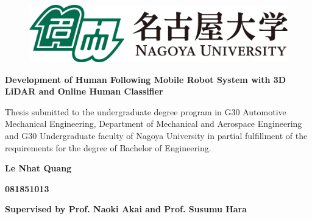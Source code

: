 \documentclass[12pt, oneside]{book}
\begin{document}
\begin{titlepage}
  \begin{center}

    \begin{figure}
      \hspace*{-0.7cm}
      \centering
      \includegraphics[scale=0.5]{figures/Nagoya_Logo.png}
      \vspace{0.8cm}
    \end{figure}

    \vspace*{2cm}

    {\Large \textbf{Development of Human Following Mobile Robot System with 3D LiDAR and Online Human Classifier}} %

    \vspace*{2cm}
    { Thesis submitted to the undergraduate degree program in G30 Automotive Mechanical Engineering, Department of Mechanical and Aerospace Engineering and G30 Undergraduate faculty of Nagoya University in partial fulfillment of the requirements for the degree of Bachelor of Engineering.}

    \vspace*{2cm}
    {\large \textbf{Le Nhat Quang}}


    {\large \textbf{081851013}}

    \vspace*{1cm}

    {\large \textbf{Supervised by Prof. Naoki Akai and Prof. Susumu Hara}}

    \vspace*{2.0cm}


\end{center}
\end{titlepage}
\end{document}
